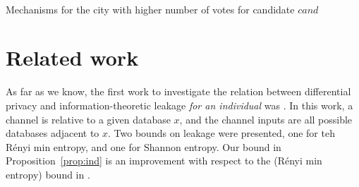 \documentclass{llncs}
\begin{document}
\begin{example}
\begin{table}[tb]
\centering	
		\ \ \ \ \ \ 
	\caption{Mechanisms for the city with higher number of votes for candidate $\mathit{cand}$}
	\label{tab:city-cand-geo}
\end{table}

\end{example}


\section{Related work}\label{section:related-work}
As far as we know, the first work to investigate the relation between
differential privacy and information-theoretic leakage \emph{for an
individual} was \cite{Alvim:10:TechRep}. In this work, a channel is relative to a given
database $x$, and the channel inputs  are all possible databases
adjacent to $x$. Two bounds on leakage were presented, one for teh R\'enyi min entropy, and one for Shannon entropy. 
Our bound in Proposition~\ref{prop:ind} is an improvement
with respect to the (R\'enyi min entropy) bound in \cite{Alvim:10:TechRep}.
\end{document}
